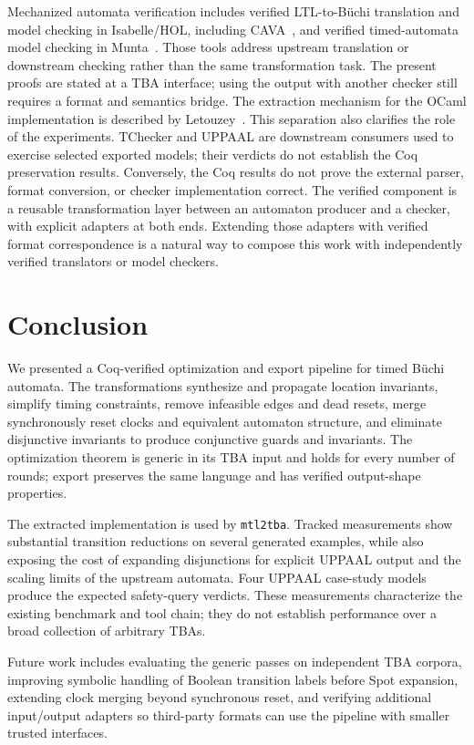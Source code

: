\documentclass{ieeeaccess}
\begin{document}
Mechanized automata verification includes verified LTL-to-B\"uchi translation and model checking in Isabelle/HOL, including CAVA~\cite{schimpf_tphols09,cava_cav13}, and verified timed-automata model checking in Munta~\cite{munta_tacas18,munta_formats19}. Those tools address upstream translation or downstream checking rather than the same transformation task. The present proofs are stated at a TBA interface; using the output with another checker still requires a format and semantics bridge. The extraction mechanism for the OCaml implementation is described by Letouzey~\cite{letouzey_extraction}.
This separation also clarifies the role of the experiments. TChecker and
UPPAAL are downstream consumers used to exercise selected exported models;
their verdicts do not establish the Coq preservation results. Conversely, the
Coq results do not prove the external parser, format conversion, or checker
implementation correct. The verified component is a reusable transformation
layer between an automaton producer and a checker, with explicit adapters at
both ends. Extending those adapters with verified format correspondence is a
natural way to compose this work with independently verified translators or
model checkers.

\section{Conclusion}
\label{sec:conclusion}
We presented a Coq-verified optimization and export pipeline for timed B\"uchi automata. The transformations synthesize and propagate location invariants, simplify timing constraints, remove infeasible edges and dead resets, merge synchronously reset clocks and equivalent automaton structure, and eliminate disjunctive invariants to produce conjunctive guards and invariants. The optimization theorem is generic in its TBA input and holds for every number of rounds; export preserves the same language and has verified output-shape properties.

The extracted implementation is used by \texttt{mtl2tba}. Tracked measurements show substantial transition reductions on several generated examples, while also exposing the cost of expanding disjunctions for explicit UPPAAL output and the scaling limits of the upstream automata. Four UPPAAL case-study models produce the expected safety-query verdicts. These measurements characterize the existing benchmark and tool chain; they do not establish performance over a broad collection of arbitrary TBAs.

Future work includes evaluating the generic passes on independent TBA corpora, improving symbolic handling of Boolean transition labels before Spot expansion, extending clock merging beyond synchronous reset, and verifying additional input/output adapters so third-party formats can use the pipeline with smaller trusted interfaces.


\EOD
\end{document}
